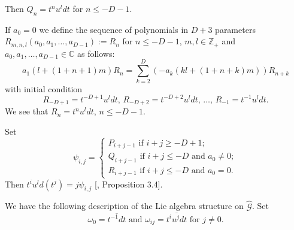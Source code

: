 \documentclass[review,nopreprintline]{elsarticle}
\theoremstyle{definition}
\numberwithin{equation}{section}
\theoremstyle{remark}
\newcommand{\Cx}{\mathbb{C}}
\begin{document}
		Then $Q_n=t^{n}u^ldt$ for $n\leq -D-1$.
	     
	        
	  	If $a_0=0$ we define the sequence of polynomials in $D+3$ parameters $R_{m,n,l}(a_{0},a_{1},\dots,a_{D-1}):=R_{n}$ for $n\leq -D-1$, $m, l\in\mathbb{Z}_+$ and $a_{0},a_{1},\dots,a_{D-1}\in\Cx$ as follows:
		\begin{equation} \label{polinomios3}
  			a_1(l+(1+n+1)m)R_n=\sum_{k=2}^{D}\left(-a_k\left(kl+(1+n+k)m\right) \right) R_{n+k}
		\end{equation}
		with initial condition
		\begin{equation} \label{condicoesiniciais3}
			R_{-D+1}=t^{-D+1}u^ldt, \, R_{-D+2}=t^{-D+2}u^ldt, \, \dots, \, R_{-1}=t^{-1}u^ldt.
	 	\end{equation}
		We see that $R_n=t^{n}u^ldt$, $n\leq -D-1$.
	       
	  	Set 
	   	\begin{equation}
	   		\psi_{i,j}=
	       		\begin{cases}
	         		P_{i+j-1} \textrm{ if } i+j\geq -D+1;\\
	          		Q_{i+j-1} \textrm{ if } i+j\leq -D \textrm{ and } a_0\neq0;\\
	             	R_{i+j-1} \textrm{ if } i+j\leq -D\textrm{ and } a_0=0. 
	         	\end{cases}
	   	\end{equation}
	  	Then
	  	$ t^{i}u^ld(t^j) = j \psi_{i,j}$    [\cite{AlbinodosSantos2021OnAlgebras}, Proposition 3.4].      
	    
	    
	    We have the following description of the Lie algebra structure on $\hat{\mathcal{G}}$. Set 
	    \begin{equation}
	        \omega_0=\overline{t^{-1}dt} \textrm{ and } \omega_{ij}=\overline{t^{i}u^jdt} \textrm{ for } j\neq 0.
	    \end{equation}
	    
\end{document}
